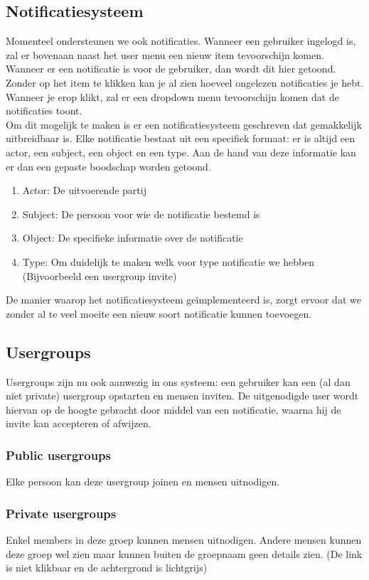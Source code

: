 \documentclass[11pt, a4paper]{article}
\begin{document}
\subsection{Notificatiesysteem}
Momenteel ondersteunen we ook notificaties. Wanneer een gebruiker ingelogd is, zal er bovenaan naast het user menu een nieuw item tevoorschijn komen. Wanneer er een notificatie is voor de gebruiker, dan wordt dit hier getoond. Zonder op het item te klikken kan je al zien hoeveel ongelezen notificaties je hebt. Wanneer je erop klikt, zal er een dropdown menu tevoorschijn komen dat de notificaties toont. \\ 
Om dit mogelijk te maken is er een notificatiesysteem geschreven dat gemakkelijk uitbreidbaar is. Elke notificatie bestaat uit een specifiek formaat: er is altijd een actor, een subject, een object en een type. Aan de hand van deze informatie kan er dan een gepaste boodschap worden getoond. 
\begin{enumerate}
\item Actor: De uitvoerende partij
\item Subject: De persoon voor wie de notificatie bestemd is
\item Object: De specifieke informatie over de notificatie
\item Type: Om duidelijk te maken welk voor type notificatie we hebben (Bijvoorbeeld een usergroup invite)
\end{enumerate}
De manier waarop het notificatiesysteem ge\"implementeerd is, zorgt ervoor dat we zonder al te veel moeite een nieuw soort notificatie kunnen toevoegen.

\subsection{Usergroups}
Usergroups zijn nu ook aanwezig in ons systeem: een gebruiker kan een (al dan niet private) usergroup opstarten en mensen inviten. De uitgenodigde user wordt hiervan op de hoogte gebracht door middel van een notificatie, waarna hij de invite kan accepteren of afwijzen.
\subsubsection{Public usergroups}
Elke persoon kan deze usergroup joinen en mensen uitnodigen.
\subsubsection{Private usergroups}
Enkel members in deze groep kunnen mensen uitnodigen. Andere mensen kunnen deze groep wel zien maar kunnen buiten de groepnaam geen details zien. (De link is niet klikbaar en de achtergrond is lichtgrijs)
\end{document}

